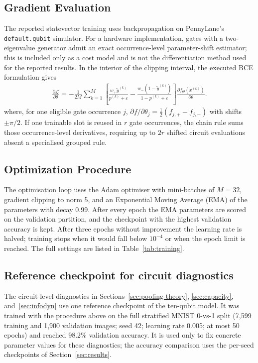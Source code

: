 \documentclass[conference]{IEEEtran}
\begin{document}
\subsection{Gradient Evaluation}
The reported statevector training uses backpropagation on PennyLane's \texttt{default.qubit} simulator. For a hardware implementation, gates with a two-eigenvalue generator admit an exact occurrence-level parameter-shift estimator; this is included only as a cost model and is not the differentiation method used for the reported results. In the interior of the clipping interval, the executed BCE formulation gives
\begin{align}
\frac{\partial \mathcal{L}}{\partial \theta} = -\frac{1}{2M} \sum_{k=1}^{M}
\left[\frac{w_{+}\tilde{y}^{(k)}}{p^{(k)}+\varepsilon}
-\frac{w_{-}(1-\tilde{y}^{(k)})}{1-p^{(k)}+\varepsilon}\right]
\frac{\partial f_{\Theta}(x^{(k)})}{\partial \theta}.
\end{align}
where, for one eligible gate occurrence $j$, $\partial f/\partial\theta_j = \tfrac{1}{2}(f_{j,+}-f_{j,-})$ with shifts $\pm\pi/2$. If one trainable slot is reused in $r$ gate occurrences, the chain rule sums those occurrence-level derivatives, requiring up to $2r$ shifted circuit evaluations absent a specialised grouped rule. 

\subsection{Optimization Procedure}
The optimisation loop uses the Adam optimiser with mini-batches of $M = 32$, gradient clipping to norm 5, and an Exponential Moving Average (EMA) of the parameters with decay 0.99. After every epoch the EMA parameters are scored on the validation partition, and the checkpoint with the highest validation accuracy is kept. After three epochs without improvement the learning rate is halved; training stops when it would fall below $10^{-4}$ or when the epoch limit is reached. The full settings are listed in Table~\ref{tab:training}.

\subsection{Reference checkpoint for circuit diagnostics}
\label{sec:reference}
The circuit-level diagnostics in Sections~\ref{sec:pooling-theory},
\ref{sec:capacity}, and~\ref{sec:infodyn} use one reference checkpoint of the
ten-qubit model. It was
trained with the procedure above on the full stratified MNIST 0-vs-1 split
(7,599 training and 1,900 validation images; seed 42; learning rate 0.005; at
most 50 epochs) and reached 98.2\% validation accuracy. It is used only to fix
concrete parameter values for these diagnostics; the accuracy comparison uses
the per-seed checkpoints of Section~\ref{sec:results}.
\end{document}
